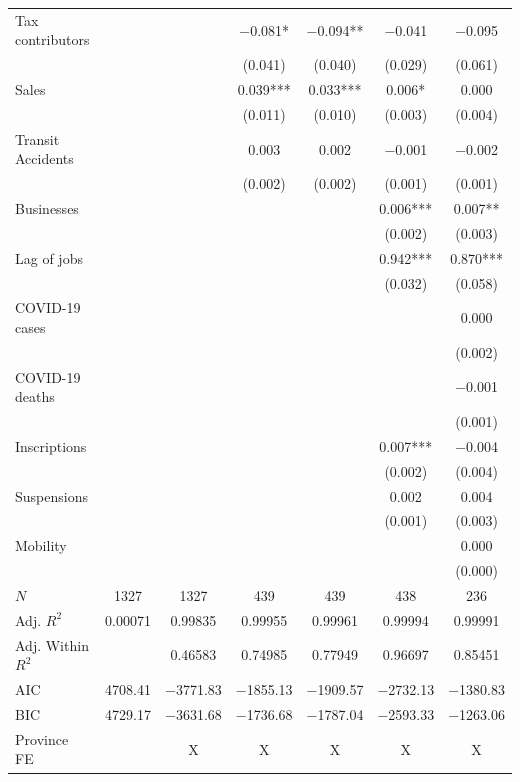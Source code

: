 \documentclass[11pt,a4paper]{article}\usepackage[]{graphicx}\usepackage[]{xcolor}
\begin{document}
\begin{table}[h]
\begin{tabular}[t]{lcccccc}
Tax contributors &  &  & \num{-0.081}* & \num{-0.094}** & \num{-0.041} & \num{-0.095}\\
 &  &  & (\num{0.041}) & (\num{0.040}) & (\num{0.029}) & (\num{0.061})\\
Sales &  &  & \num{0.039}*** & \num{0.033}*** & \num{0.006}* & \num{0.000}\\
 &  &  & (\num{0.011}) & (\num{0.010}) & (\num{0.003}) & (\num{0.004})\\
Transit Accidents &  &  & \num{0.003} & \num{0.002} & \num{-0.001} & \num{-0.002}\\
 &  &  & (\num{0.002}) & (\num{0.002}) & (\num{0.001}) & (\num{0.001})\\
Businesses &  &  &  &  & \num{0.006}*** & \num{0.007}**\\
 &  &  &  &  & (\num{0.002}) & (\num{0.003})\\
Lag of jobs &  &  &  &  & \num{0.942}*** & \num{0.870}***\\
 &  &  &  &  & (\num{0.032}) & (\num{0.058})\\
COVID-19 cases &  &  &  &  &  & \num{0.000}\\
 &  &  &  &  &  & (\num{0.002})\\
COVID-19 deaths &  &  &  &  &  & \num{-0.001}\\
 &  &  &  &  &  & (\num{0.001})\\
Inscriptions &  &  &  &  & \num{0.007}*** & \num{-0.004}\\
 &  &  &  &  & (\num{0.002}) & (\num{0.004})\\
Suspensions &  &  &  &  & \num{0.002} & \num{0.004}\\
 &  &  &  &  & (\num{0.001}) & (\num{0.003})\\
Mobility &  &  &  &  &  & \num{0.000}\\
 &  &  &  &  &  & (\num{0.000})\\
\midrule
$N$ & \num{1327} & \num{1327} & \num{439} & \num{439} & \num{438} & \num{236}\\
Adj. $R^2$ & \num{0.00071} & \num{0.99835} & \num{0.99955} & \num{0.99961} & \num{0.99994} & \num{0.99991}\\
Adj. Within $R^2$ &  & \num{0.46583} & \num{0.74985} & \num{0.77949} & \num{0.96697} & \num{0.85451}\\
AIC & \num{4708.41} & \num{-3771.83} & \num{-1855.13} & \num{-1909.57} & \num{-2732.13} & \num{-1380.83}\\
BIC & \num{4729.17} & \num{-3631.68} & \num{-1736.68} & \num{-1787.04} & \num{-2593.33} & \num{-1263.06}\\
Province FE &  & X & X & X & X & X\\
\bottomrule
\end{tabular}


\end{table}
\clearpage
\end{document}
